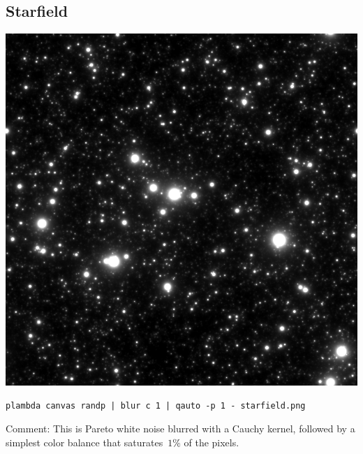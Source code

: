 \subsection{Starfield}
\includegraphics{starfield.png}
\begin{verbatim}
plambda canvas randp | blur c 1 | qauto -p 1 - starfield.png
\end{verbatim}
Comment: This is Pareto white noise blurred with a Cauchy kernel, followed by
a simplest color balance that saturates~$1\%$ of the pixels.

